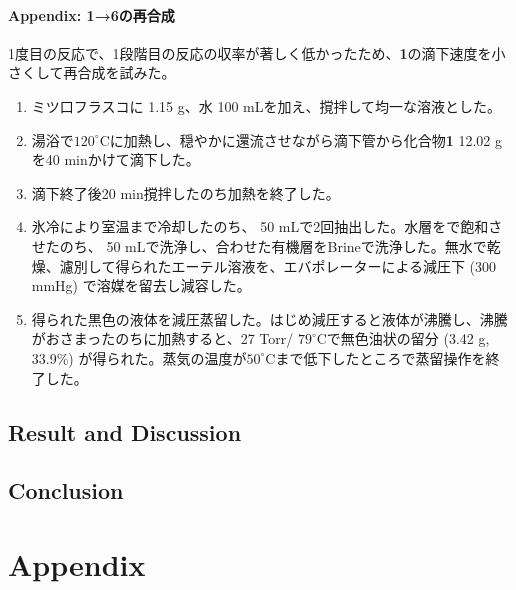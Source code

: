 \documentclass{ltjsarticle}
\theoremstyle{definition}
\numberwithin{equation}{section}
\newcommand{\D}{^\circ\text{C}}
\begin{document}
\paragraph{Appendix: \textbf{1}→\textbf{6}の再合成}
1度目の反応で、1段階目の反応の収率が著しく低かったため、\textbf{1}の滴下速度を小さくして再合成を試みた。
\begin{enumerate}
\item ミツ口フラスコに 1.15 g、水 100 mLを加え、撹拌して均一な溶液とした。
\item 湯浴で$120\D$に加熱し、穏やかに還流させながら滴下管から化合物\textbf{1} 12.02 gを40 minかけて滴下した。 
\item 滴下終了後20 min撹拌したのち加熱を終了した。
\item 氷冷により室温まで冷却したのち、 50 mLで2回抽出した。水層をで飽和させたのち、 50 mLで洗浄し、合わせた有機層をBrineで洗浄した。無水で乾燥、濾別して得られたエーテル溶液を、エバポレーターによる減圧下 (300 mmHg) で溶媒を留去し減容した。
\item 得られた黒色の液体を減圧蒸留した。はじめ減圧すると液体が沸騰し、沸騰がおさまったのちに加熱すると、27 Torr/ $79\D$で無色油状の留分 (3.42 g, 33.9\%) が得られた。蒸気の温度が$50\D$まで低下したところで蒸留操作を終了した。
\end{enumerate}

\subsection{Result and Discussion}


\subsection{Conclusion}

\section{Appendix}
\end{document}
